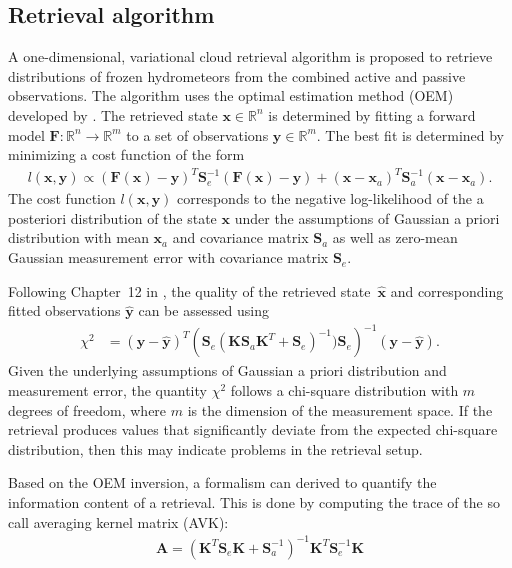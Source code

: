 \documentclass[journal abbreviation, manuscript]{copernicus}
\begin{document}
\subsection{Retrieval algorithm}
\label{sec:orgb528563}

A one-dimensional, variational cloud retrieval algorithm is proposed to
retrieve distributions of frozen hydrometeors from the combined active and
passive observations. The algorithm uses the optimal estimation method (OEM)
developed by \cite{rodgers00}. The retrieved state $\mathbf{x} \in
   \mathbb{R}^n$ is determined by fitting a forward model $\mathbf{F} : \mathbb{R}^n
   \rightarrow \mathbb{R}^m$ to a set of observations $\mathbf{y} \in
   \mathbb{R}^m$. The best fit is determined by minimizing a cost function of
the form
\begin{align}
l(\mathbf{x}, \mathbf{y}) \propto
 \left(\mathbf{F}(\mathbf{x}) - \mathbf{y} \right )^T
  \mathbf{S}_e^{-1} 
  \left ( \mathbf{F}(\mathbf{x}) - \mathbf{y} \right)
+ \left ( \mathbf{x} - \mathbf{x}_a \right )^T
 \mathbf{S}^{-1}_a 
 \left ( \mathbf{x} - \mathbf{x}_a \right ).
\end{align}
%
The cost function $l(\mathbf{x}, \mathbf{y})$ corresponds to the negative
log-likelihood of the a posteriori distribution of the state $\mathbf{x}$ under
the assumptions of Gaussian a priori distribution with mean $\mathbf{x}_a$ and
covariance matrix $\mathbf{S}_a$ as well as zero-mean Gaussian measurement error
with covariance matrix $\mathbf{S}_e$.

Following Chapter~12 in \cite{rodgers00}, the quality of the retrieved state\
$\hat{\mathbf{x}}$ and corresponding fitted observations $\hat{\mathbf{y}}$ can
be assessed using 
%
\begin{align}
  \chi^2 &= (\mathbf{y} - \hat{\mathbf{y}})^T \left (
  \mathbf{S}_e (\mathbf{K}\mathbf{S}_a\mathbf{K}^T + \mathbf{S}_e)^{-1}) \mathbf{S}_e
  \right )^{-1} (\mathbf{y} - \hat{\mathbf{y}}).
\end{align}
%
Given the underlying assumptions of Gaussian a priori distribution and
measurement error, the quantity $\chi^2$ follows a chi-square distribution with
$m$ degrees of freedom, where $m$ is the dimension of the measurement space. If
the retrieval produces values that significantly deviate from the expected
chi-square distribution, then this may indicate problems in the retrieval setup.

Based on the OEM inversion, a formalism can derived to quantify the information
content of a retrieval. This is done by computing the trace of the so call
averaging kernel matrix (AVK):
\begin{align}
\mathbf{A} = (\mathbf{K}^T \mathbf{S}_e\mathbf{K} + \mathbf{S}_a^{-1})^{-1}
\mathbf{K}^T\mathbf{S}_e^{-1}\mathbf{K}
\end{align}
\end{document}
